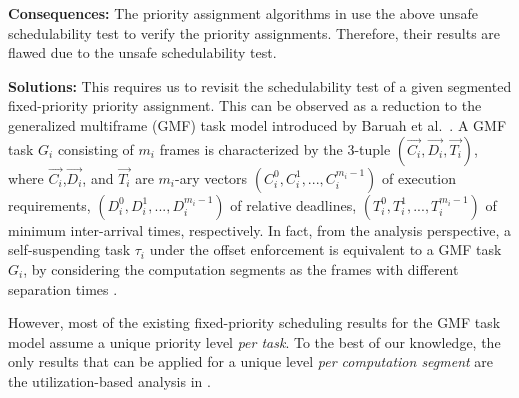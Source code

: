 {\bf Consequences:} The priority assignment algorithms in \cite{RTSS-KimANR13,DBLP:journals/ieicet/DingTT09} use the above unsafe schedulability test to verify the priority assignments. Therefore, their results are flawed due to the unsafe schedulability test.

{\bf Solutions:} This requires us to revisit the schedulability test of a given segmented fixed-priority priority assignment. This can be observed as a reduction to 
the generalized multiframe (GMF) task model introduced by Baruah et al.~\cite{baruah1999generalized}. A GMF task $G_i$ consisting of $m_i$ frames is characterized by the $3$-tuple $(\vec{C_i},\vec{D_i},\vec{T_i})$, where $\vec{C_i}$,$\vec{D_i}$, and $\vec{T_i}$ are $m_i$-ary vectors $(C_{i}^0,C_{i}^1,...,C_{i}^{m_i-1})$ of execution requirements, $(D_{i}^0,D_{i}^1,...,D_{i}^{m_i-1})$ of relative deadlines, $(T_{i}^0,T_{i}^1,...,T_{i}^{m_i-1})$ of minimum inter-arrival times, respectively.
In fact, from the analysis perspective, a self-suspending task $\tau_i$ under the offset enforcement is equivalent to a GMF task $G_i$,  by considering the computation segments as the frames with different separation times \cite{WC16-suspend-DATE,DBLP:journals/ieicet/DingTT09}.

However, most of the existing fixed-priority scheduling results for the GMF task model assume a unique priority level \emph{per task}. To the best of our knowledge, the only results that can be applied for a unique level \emph{per computation segment} are the utilization-based analysis in \cite{DBLP:journals/corr/ChenHL15b,huang2015mode}. 




